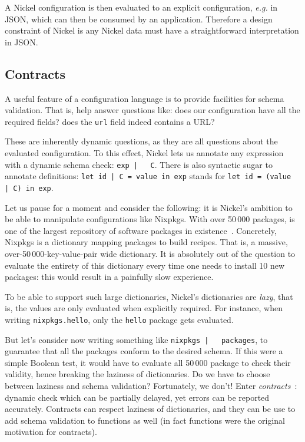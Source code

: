 \documentclass[sigplan,10pt,review,anonymous]{acmart}
\newcommand{\unsure}[2][1=]{}
\newcommand{\nickel}[1]{\lstinline[language=nickel]{#1}}
\begin{document}
A Nickel configuration is then evaluated to an explicit configuration,
\emph{e.g.}  in JSON, which can then be consumed by an
application. Therefore a design constraint of Nickel is any Nickel
data must have a straightforward interpretation in JSON.

\subsection{Contracts}

A useful feature of a configuration language is to provide facilities
for schema validation. That is, help answer questions like: does our
configuration have all the required fields? does the \nickel{url} field indeed
contains a URL?

These are inherently dynamic questions, as they are all questions
about the evaluated configuration. To this effect, Nickel lets us
annotate any expression with a dynamic schema check: \nickel{exp |
  C}. There is also syntactic sugar to annotate definitions:
\nickel{let id | C = value in exp} stands for \nickel{let id = (value
  | C) in exp}.\unsure{This point used to be made, do we want to
  reinsert it? However, Nickel programs are of a special kind: they are usually
simple, terminating programs that run on fixed inputs. Correctness errors will
show up at evaluation anyway, or will not matter (dead code).}

Let us pause for a moment and consider the following: it is Nickel's
ambition to be able to manipulate configurations like Nixpkgs. With
over 50\,000 packages, is one of the largest repository of software
packages in existence~\cite{repology}. Concretely, Nixpkgs is a
dictionary mapping packages to build recipes. That is, a massive,
over-50\,000-key-value-pair wide dictionary. It is absolutely out of the
question to evaluate the entirety of this dictionary every time one
needs to install 10 new packages: this would result in a painfully
slow experience.

To be able to support such large dictionaries, Nickel's dictionaries
are \emph{lazy}, that is, the values are only evaluated when
explicitly required. For instance, when writing
\hbox{\nickel{nixpkgs.hello},} only the \nickel{hello} package gets
evaluated.

But let's consider now writing something like \nickel{nixpkgs |
  packages}, to guarantee that all the packages conform to the desired
schema. If this were a simple Boolean test, it would have to evaluate
all 50\,000 package to check their validity, hence breaking the
laziness of dictionaries. Do we have to choose between laziness and
schema validation? Fortunately, we don't! Enter
\emph{contracts}~\cite{FindlerFelleisenHOContracts}: dynamic check
which can be partially delayed, yet errors can be reported
accurately. Contracts can respect laziness of dictionaries, and they
can be use to add schema validation to functions as well (in fact
functions were the original motivation for contracts).
\end{document}

